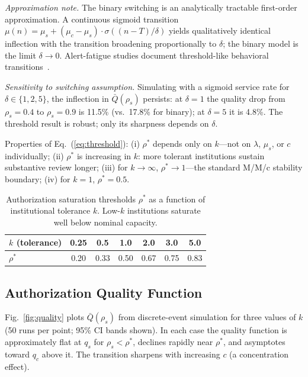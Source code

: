 \documentclass[runningheads]{llncs}
\begin{document}
\noindent\textit{Approximation note.} The binary switching is an analytically tractable
first-order approximation. A continuous sigmoid transition
$\mu(n) = \mu_s + (\mu_c - \mu_s)\cdot\sigma((n{-}T)/\delta)$ yields
qualitatively identical inflection with the transition broadening proportionally
to $\delta$; the binary model is the limit $\delta \to 0$.
Alert-fatigue studies document threshold-like behavioral transitions~\cite{ancker2017}.

\smallskip\noindent\textit{Sensitivity to switching assumption.}
Simulating with a sigmoid service rate for
$\delta \in \{1, 2, 5\}$, the inflection in $\bar{Q}(\rho_s)$ persists:
at $\delta=1$ the quality drop from $\rho_s=0.4$ to $\rho_s=0.9$ is
11.5\% (vs.\ 17.8\% for binary); at $\delta=5$ it is 4.8\%.
The threshold result is robust; only its sharpness depends on $\delta$.

\noindent Properties of Eq.~(\ref{eq:threshold}):
(i) $\rho^*$ depends only on $k$---not on $\lambda$, $\mu_s$, or $c$ individually;
(ii) $\rho^*$ is increasing in $k$: more tolerant institutions sustain substantive
review longer; (iii) for $k \to \infty$, $\rho^* \to 1$---the standard M/M/c
stability boundary; (iv) for $k = 1$, $\rho^* = 0.5$.

\begin{table}[t]
\centering
\caption{Authorization saturation thresholds $\rho^*$ as a function of
institutional tolerance $k$. Low-$k$ institutions saturate well below nominal capacity.}
\label{tab:thresholds}
\begin{tabular}{@{}lcccccc@{}}
\toprule
$k$ (tolerance) & 0.25 & 0.5 & 1.0 & 2.0 & 3.0 & 5.0 \\
\midrule
$\rho^*$ & 0.20 & 0.33 & 0.50 & 0.67 & 0.75 & 0.83 \\
\bottomrule
\end{tabular}
\vspace{-10pt}
\end{table}

\subsection{Authorization Quality Function}

Fig.~\ref{fig:quality} plots $\bar{Q}(\rho_s)$ from discrete-event simulation
for three values of $k$ (50 runs per point; 95\% CI bands shown). In each case
the quality function is approximately flat at $q_s$ for $\rho_s < \rho^*$,
declines rapidly near $\rho^*$, and asymptotes toward $q_c$ above it.
The transition sharpens with increasing $c$ (a concentration effect).
\end{document}
